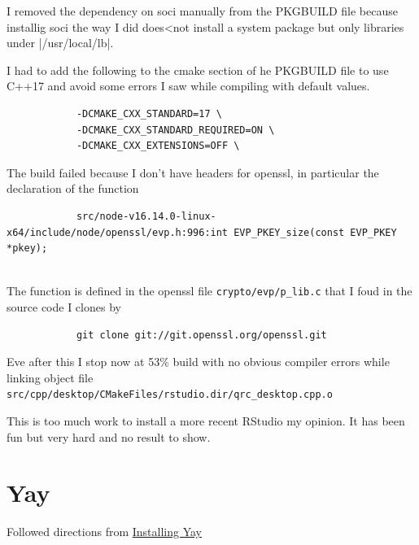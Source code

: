 \documentclass[]{scrartcl}
\begin{document}
	I removed the dependency on soci manually from the PKGBUILD file because installig soci the way I did does<not install a system package but only libraries under |/usr/local/lb|.
	
	I had to add the following to the cmake section of he PKGBUILD file to use C++17 and avoid some errors I saw while compiling with default values.
	
	\begin{tiny}
		\begin{verbatim}
			-DCMAKE_CXX_STANDARD=17 \
			-DCMAKE_CXX_STANDARD_REQUIRED=ON \
			-DCMAKE_CXX_EXTENSIONS=OFF \
		\end{verbatim}
	\end{tiny}
	
	The build failed because I don't have headers for openssl, in particular the declaration of the function
	
	\begin{tiny}
		\begin{verbatim}
			src/node-v16.14.0-linux-x64/include/node/openssl/evp.h:996:int EVP_PKEY_size(const EVP_PKEY *pkey);
			
		\end{verbatim}
	\end{tiny}
	
	The function is defined in the openssl file \verb|crypto/evp/p_lib.c| that I foud in the source code I clones by
	
	\begin{small}
		\begin{verbatim}
			git clone git://git.openssl.org/openssl.git
		\end{verbatim}
	\end{small}
	
	Eve after this I stop now at 53\% build with no obvious compiler errors while linking object file \verb|src/cpp/desktop/CMakeFiles/rstudio.dir/qrc_desktop.cpp.o|
	
	This is too much work to install a more recent RStudio  my opinion. It has been fun but very hard and no result to show.
	
	
	
	\section{Yay}
	\label{sec:yay}
	
	Followed directions from \href{https://www.tecmint.com/install-yay-aur-helper-in-arch-linux-and-manjaro/}{Installing Yay}
	
\end{document}
